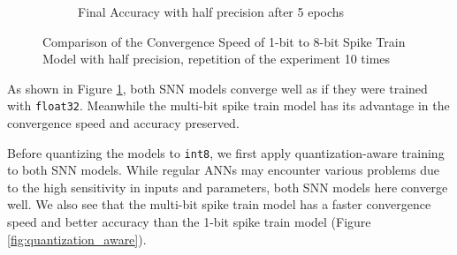 \begin{figure}[!htpb]
\begin{subfigure}[H]{0.1\textwidth}
            \caption{Final Accuracy with half precision after 5 epochs}
        \end{subfigure}
        \caption{Comparison of the Convergence Speed of 1-bit to 8-bit Spike Train Model with half precision, repetition of the experiment 10 times}
        \label{fig:half_precision}
    \end{figure}

    As shown in Figure \ref{fig:half_precision}, both SNN models converge well as if they were trained with \verb|float32|. Meanwhile the multi-bit spike train model has its advantage in the convergence speed and accuracy preserved. 
    
    Before quantizing the models to \verb|int8|, we first apply quantization-aware training to both SNN models. While regular ANNs may encounter various problems due to the high sensitivity in inputs and parameters, both SNN models here converge well. We also see that the multi-bit spike train model has a faster convergence speed and better accuracy than the 1-bit spike train model (Figure \ref{fig:quantization_aware}). 

